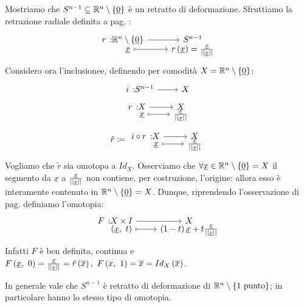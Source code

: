 \begin{example}
	\label{retrattosfera}
	Mostriamo che $S^{n-1}\subseteq \mathbb{R}^n\setminus\left\{\underline{0}\right\}$ è un retratto di deformazione. Sfruttiamo la retrazione radiale definita a pag. \pageref{retrazioneradiale}:
		\begin{equation*}
		\funztot{r}{\realset^n\setminus\left\{\underline{0}\right\}}{S^{n-1}}{\underline{x}}{r\left(\underline{x}\right)=\frac{\underline{x}}{\labs \underline{x}\rabs}}
	\end{equation*}
Considero ora l'inclusionee, definendo per comodità $X=\mathbb{R}^n\setminus\left\{\underline{0}\right\}$:
\begin{equation*}
	\funz{i}{S^{n-1}}{X}
\end{equation*}
	\begin{equation*}
		\funztot{r}{X}{X}{\underline{x}}{\frac{\underline{x}}{\labs \underline{x}\rabs}}
	\end{equation*}
			\begin{equation*}
	\tilde{r}\coloneqq\funztot{ i\circ r}{X}{X}{\underline{x}}{\frac{\underline{x}}{\labs \underline{x}\rabs}}
\end{equation*}
Vogliamo che $\tilde{r}$ sia omotopa a $Id_X$.
Osserviamo che $\forall \underline{x}\in\mathbb{R}^n\setminus\left\{\underline{0}\right\}=X$ il segmento da $\underline{x}$ a $\frac{\underline{x}}{\left|\left| \underline{x}\right|\right|}$ non contiene, per costruzione, l'origine: allora esso è interamente contenuto in $\mathbb{R}^n\setminus \left\{\underline{0}\right\}=X$. Dunque, riprendendo l'osservazione di pag. \pageref{omotopiasegmento} definiamo l'omotopia:
\begin{equation*}
	\funztot{F}{X\times I}{X}{\left(\underline{x},\ t\right)}{\left(1-t\right)\underline{x}+t\frac{\underline{x}}{\labs \underline{x}\rabs}}
\end{equation*}
Infatti $F$ è ben definita, continua e $\mvf{F}{\underline{x}}{0}=\frac{\underline{x}}{\labs \underline{x}\rabs}=\tilde{r}\left(\overline{x}\right),\ \mvf{F}{x}{1}=\overline{x}=Id_X\left(\overline{x}\right)$.
\end{example}
\begin{corollary}
	In generale vale che $S^{n-1}$ è retratto di deformazione di $\mathbb{R}^n\setminus\left\{1\text{ punto}\right\}$; in particolare hanno lo stesso tipo di omotopia.
\end{corollary}

